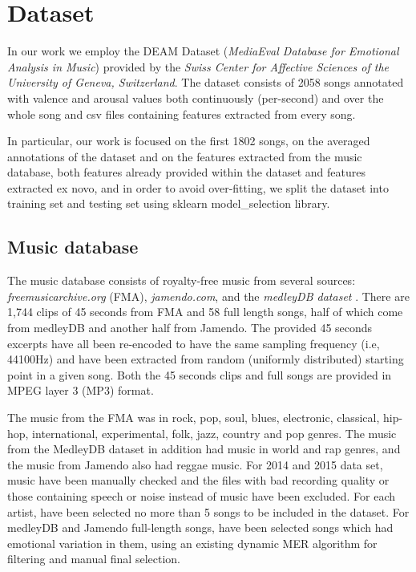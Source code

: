 \section{Dataset}
In our work we employ the DEAM Dataset (\textit{MediaEval Database for Emotional Analysis in Music}) provided by the \textit{Swiss Center for Affective Sciences of the University of Geneva, Switzerland}.
The dataset consists of 2058 songs annotated with valence and arousal values both continuously (per-second) and over the whole song and csv files containing features extracted from every song.

In particular, our work is focused on the first 1802 songs, on the averaged annotations of the dataset and on the features extracted from the music database, both features already provided within the dataset and features extracted ex novo, and in order to avoid over-fitting, we split the dataset into training set and testing set using sklearn model\_selection library.


\subsection{Music database}

The music database consists of royalty-free music from several sources: \textit{freemusicarchive.org} (FMA), \textit{jamendo.com}, and the \textit{medleyDB dataset} \cite{bittner2014medleydb}. There are 1,744 clips of 45 seconds from FMA and 58 full length songs, half of which come from medleyDB and another half from Jamendo.\cite{aljanaki2017developing}
The provided 45 seconds excerpts have all been re-encoded to have the same sampling frequency (i.e, 44100Hz) and have been extracted from random (uniformly distributed) starting point in a given song. Both the 45 seconds clips and full songs are provided in MPEG layer 3 (MP3) format.\cite{soleymani2016deam}

The music from the FMA was in rock, pop, soul, blues, electronic, classical, hip-hop, international, experimental, folk, jazz, country and pop genres. The music from the MedleyDB dataset in addition had music in world and rap genres, and the music from Jamendo also had reggae music. For 2014 and 2015 data set, music have been manually checked and the files with bad recording quality or those containing speech or noise instead of music have been excluded. For each artist, have been selected no more than 5 songs to be included in the dataset. For medleyDB and Jamendo full-length songs, have been selected songs which had emotional variation in them, using an existing dynamic MER algorithm for filtering and manual final selection\cite{anna2015emotion}.


